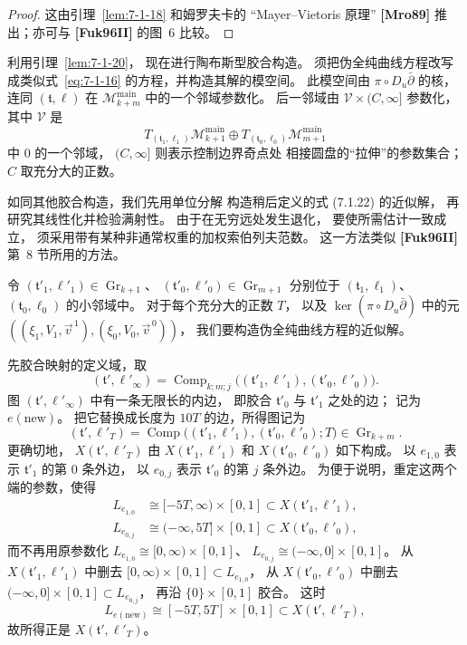 \begin{proof}
这由引理~\ref{lem:7-1-18}
和姆罗夫卡的 ``Mayer--Vietoris 原理'' \textbf{[Mro89]}
推出；亦可与 \textbf{[Fuk96II]} 的图~6 比较。
\end{proof}

利用引理~\ref{lem:7-1-20}，
现在进行陶布斯型胶合构造。
须把伪全纯曲线方程改写成类似式~\eqref{eq:7-1-16}
的方程，并构造其解的模空间。
此模空间由 $\pi\circ D_u\bar\partial$ 的核，
连同 $(\mathfrak t,\ell)$ 在
$\mathcal M^{\mathrm{main}}_{k+m}$
中的一个邻域参数化。
后一邻域由 $\mathcal V\times(C,\infty]$ 参数化，
其中 $\mathcal V$ 是
\[
T_{(\mathfrak t_1,\ell_1)}
\mathcal M^{\mathrm{main}}_{k+1}
\oplus
T_{(\mathfrak t_0,\ell_0)}
\mathcal M^{\mathrm{main}}_{m+1}
\]
中 $0$ 的一个邻域，
$(C,\infty]$ 则表示控制边界奇点处
相接圆盘的“拉伸”的参数集合；
$C$ 取充分大的正数。

如同其他胶合构造，我们先用单位分解
构造稍后定义的式 (7.1.22) 的近似解，
再研究其线性化并检验满射性。
由于在无穷远处发生退化，
要使所需估计一致成立，
须采用带有某种非通常权重的加权索伯列夫范数。
这一方法类似 \textbf{[Fuk96II]} 第~8 节所用的方法。

令
$(\mathfrak t'_1,\ell'_1)\in\operatorname{Gr}_{k+1}$、
$(\mathfrak t'_0,\ell'_0)\in\operatorname{Gr}_{m+1}$
分别位于
$(\mathfrak t_1,\ell_1)$、
$(\mathfrak t_0,\ell_0)$ 的小邻域中。
对于每个充分大的正数 $T$，
以及
$\ker(\pi\circ D_u\bar\partial)$ 中的元
$((\xi_1,V_1,\vec v^{\,1}),
(\xi_0,V_0,\vec v^{\,0}))$，
我们要构造伪全纯曲线方程的近似解。

先胶合映射的定义域，取
\[
(\mathfrak t',\ell'_\infty)
=\operatorname{Comp}_{k;m;j}
 \bigl((\mathfrak t'_1,\ell'_1),
       (\mathfrak t'_0,\ell'_0)\bigr).
\]
图 $(\mathfrak t',\ell'_\infty)$ 中有一条无限长的内边，
即胶合 $\mathfrak t'_0$ 与 $\mathfrak t'_1$ 之处的边；
记为 $e(\mathrm{new})$。
把它替换成长度为 $10T$ 的边，所得图记为
\[
(\mathfrak t',\ell'_T)
=\operatorname{Comp}
 \bigl((\mathfrak t'_1,\ell'_1),
       (\mathfrak t'_0,\ell'_0);T\bigr)
\in\operatorname{Gr}_{k+m}.
\]
更确切地，
$X(\mathfrak t',\ell'_T)$ 由
$X(\mathfrak t'_1,\ell'_1)$ 和
$X(\mathfrak t'_0,\ell'_0)$ 如下构成。
以 $e_{1,0}$ 表示 $\mathfrak t'_1$ 的第 $0$ 条外边，
以 $e_{0,j}$ 表示 $\mathfrak t'_0$ 的第 $j$ 条外边。
为便于说明，重定这两个端的参数，使得
\[
\begin{aligned}
L_{e_{1,0}}&\cong[-5T,\infty)\times[0,1]
 \subset X(\mathfrak t'_1,\ell'_1),\\
L_{e_{0,j}}&\cong(-\infty,5T]\times[0,1]
 \subset X(\mathfrak t'_0,\ell'_0),
\end{aligned}
\]
而不再用原参数化
$L_{e_{1,0}}\cong[0,\infty)\times[0,1]$、
$L_{e_{0,j}}\cong(-\infty,0]\times[0,1]$。
从 $X(\mathfrak t'_1,\ell'_1)$ 中删去
$[0,\infty)\times[0,1]\subset L_{e_{1,0}}$，
从 $X(\mathfrak t'_0,\ell'_0)$ 中删去
$(-\infty,0]\times[0,1]\subset L_{e_{0,j}}$，
再沿 $\{0\}\times[0,1]$ 胶合。
这时
\[
L_{e(\mathrm{new})}\cong[-5T,5T]\times[0,1]
\subset X(\mathfrak t',\ell'_T),
\]
故所得正是 $X(\mathfrak t',\ell'_T)$。

